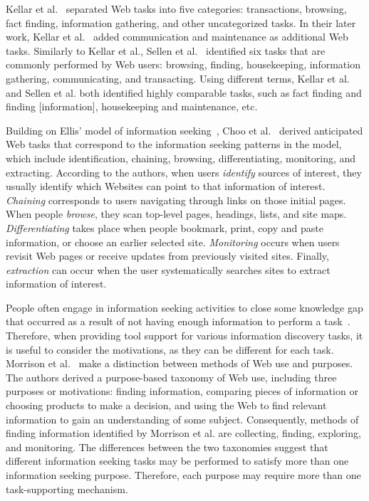 \documentclass{sigchi}
\begin{document}
Kellar et al.~\cite{kellar2006goal} separated Web tasks into five categories: transactions, browsing, fact finding, information gathering, and other uncategorized tasks. In their later work, Kellar et al.~\cite{kellar2007field} added communication and maintenance as additional Web tasks. Similarly to Kellar et al., Sellen et al.~\cite{sellen2002knowledge} identified six tasks that are commonly performed by Web users: browsing, finding, housekeeping, information gathering, communicating, and transacting. Using different terms, Kellar et al. and Sellen et al. both identified highly comparable tasks, such as fact finding and finding [information], housekeeping and maintenance, etc. 

Building on Ellis' model of information seeking~\cite{ellis1989behavioural,ellis1993comparison,ellis1997modelling}, Choo et al.~\cite{choo2000information} derived anticipated Web tasks that correspond to the information seeking patterns in the model, which include identification, chaining, browsing, differentiating, monitoring, and extracting.  According to the authors, when users \textit{identify} sources of interest, they usually identify which Websites can point to that information of interest.  \textit{Chaining} corresponds to users navigating through links on those initial pages. When people \textit{browse}, they scan top-level pages, headings, lists, and site maps. \textit{Differentiating} takes place when people bookmark, print, copy and paste information, or choose an earlier selected site. \textit{Monitoring} occurs when users revisit Web pages or receive updates from previously visited sites. Finally, \textit{extraction} can occur when the user systematically searches sites to extract information of interest.  

People often engage in information seeking activities to close some knowledge gap that occurred as a result of not having enough information to perform a task~\cite{proper1999information}. Therefore, when providing tool support for various information discovery tasks, it is useful to consider the motivations, as they can be different for each task. Morrison et al.~\cite{morrison2001taxonomic} make a distinction between methods of Web use and purposes. The authors derived a purpose-based taxonomy of Web use, including three purposes or motivations: finding information, comparing pieces of information or choosing products to make a decision, and using the Web to find relevant information to gain an understanding of some subject. Consequently, methods of finding information identified by Morrison et al. are collecting, finding, exploring, and monitoring. The differences between the two taxonomies suggest that different information seeking tasks may be performed to satisfy more than one information seeking purpose. Therefore, each purpose may require more than one task-supporting mechanism. 
\end{document}
